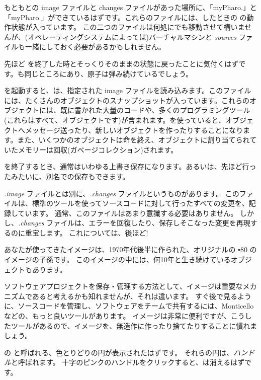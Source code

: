 \documentclass[a4paper,10pt,twoside]{book}
\begin{document}
もともとの image ファイルと changes ファイルがあった場所に、「myPharo.」と「myPharo.」ができているはずです。これらのファイルには、したときの \pharo の動作状態が入っています。
この二つのファイルは何処にでも移動させて構いませんが、(オペレーティングシステムによっては)バーチャルマシンと \emph{sources} ファイルも一緒にしておく必要があるかもしれません。


先ほど \pharo を終了した時とそっくりそのままの状態に戻ったことに気付くはずです。\bam も同じところにあり、原子は弾み続けているでしょう。

\pharo を起動すると、\pharo {}は、指定された image ファイルを読み込みます。このファイルには、たくさんのオブジェクトのスナップショットが入っています。これらのオブジェクトには、既に書かれた大量のコードや、多くのプログラミングツール(これらはすべて、オブジェクトです)が含まれます。\pharo を使っていると、オブジェクトへメッセージ送ったり、新しいオブジェクトを作ったりすることになります。また、いくつかのオブジェクトは命を終え、オブジェクトに割り当てられていたメモリーは回収(\ie ガベージコレクション)されます。

\pharo を終了するとき、通常はいわゆる上書き保存になります。あるいは、先ほど行ったみたいに、別名での保存もできます。

\emph{.image} ファイルとは別に、\emph{.changes} ファイルというものがあります。
このファイルは、標準のツールを使ってソースコードに対して行ったすべての変更を、記録しています。
通常、このファイルはあまり意識する必要はありません。
しかし、\emph{.changes} ファイルは、エラーを回復したり、保存しそこなった変更を再現するのに重宝します。
これについては、後ほど!

あなたが使ってきたイメージは、1970年代後半に作られた、オリジナルの \st-80 のイメージの子孫です。
このイメージの中には、何10年と生き続けているオブジェクトもあります。

ソフトウェアプロジェクトを保存・管理する方法として、イメージは重要なメカニズムであると考えるかも知れませんが、それは違います。
すぐ後で見るように、ソースコードを管理し、ソフトウェアをチームで共有するには、Monticelloなどの、もっと良いツールがあります。
イメージは非常に便利ですが、こうしたツールがあるので、イメージを、無造作に作ったり捨てたりすることに慣れましょう。

\bam の  と呼ばれる、色とりどりの円が表示されたはずです。
それらの円は、\emph{ハンドル}と呼ばれます。
十字のピンクのハンドルをクリックすると、\bam は消えるはずです。
\end{document}
